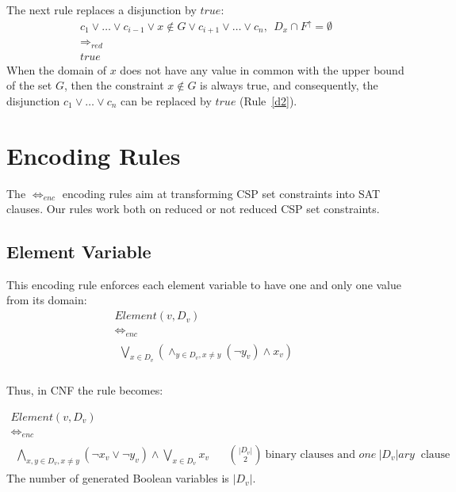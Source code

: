 \documentclass[3p,authoryear,times]{elsarticle}
\newcommand{\MS}[1]{{{#1}^{\uparrow}}}
\newcommand{\MSF}[0]{\MS{F}}
\newcommand{\rmin}[0]{{\Rightarrow_{red}}}
\newcommand{\enc}[0]{\Leftrightarrow_{enc}}
\begin{document}
\medskip

The next rule replaces a disjunction by $true$:
\begin{gather}	
c_1 \vee \ldots \vee c_{i-1} \vee x \not \in  G \vee c_{i+1} \vee \ldots \vee c_n, ~~
D_x \cap \MSF = \emptyset \nonumber \\
\rmin  \label{d2} \\
true  \nonumber
\end{gather}
When the domain of $x$ does not have any value in common with the upper bound of the set $G$, then the constraint $x \not \in  G $ is always true, and consequently, the disjunction $c_1 \vee \ldots  \vee c_n$ can be replaced by $true$ (Rule~\ref{d2}).

\section{Encoding Rules}
\label{sec:enc}

The $\enc$ encoding rules aim at transforming CSP set constraints into SAT clauses. Our rules work both on reduced or not reduced CSP set constraints.

\subsection{Element Variable}

This encoding rule enforces each element variable to have one and only one value from its domain:
\[
\begin{array}{c}
Element(v,D_v) \\
\enc \\
\begin{array}{l}
\bigvee_{x \in D_v}( \wedge_{y \in D_v, x \not = y} (\neg y_v)\wedge x_v) 
\end{array}\\
\end{array}
\]

Thus, in CNF the rule becomes:

\[
\begin{array}{c}
Element(v,D_v) \\
\enc \\
\begin{array}{ll}
\bigwedge_{x,y \in D_v, x \not = y}(\neg x_v \vee \neg y_v) \wedge \bigvee_{x \in D_v} x_v 
& ~~~~ \binom{|D_v|}{2}~\textrm{binary~clauses and~} one~ |D_v|ary~\textrm{~clause}
\end{array}
\end{array}
\]
The number of generated Boolean variables is $|D_v|$.
\end{document}
